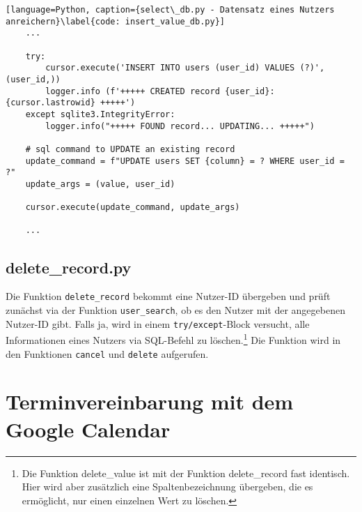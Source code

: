             \begin{lstlisting}[language=Python, caption={select\_db.py - Datensatz eines Nutzers anreichern}\label{code: insert_value_db.py}]
    ...

    try:
        cursor.execute('INSERT INTO users (user_id) VALUES (?)', (user_id,))
        logger.info (f'+++++ CREATED record {user_id}: {cursor.lastrowid} +++++')
    except sqlite3.IntegrityError:
        logger.info("+++++ FOUND record... UPDATING... +++++")

    # sql command to UPDATE an existing record
    update_command = f"UPDATE users SET {column} = ? WHERE user_id = ?"
    update_args = (value, user_id)

    cursor.execute(update_command, update_args)

    ...

            \end{lstlisting}
        
        \subsection{delete\_record.py} \label{Implementierung: delete_record.py}
            Die Funktion \verb|delete_record| bekommt eine Nutzer-ID übergeben und prüft zunächst via der Funktion \verb|user_search|, ob es den Nutzer mit der angegebenen Nutzer-ID gibt. Falls ja, wird in einem \verb|try/except|-Block versucht, alle Informationen eines Nutzers via SQL-Befehl zu löschen.\footnote{Die Funktion delete\_value ist mit der Funktion delete\_record fast identisch. Hier wird aber zusätzlich eine Spaltenbezeichnung übergeben, die es ermöglicht, nur einen einzelnen Wert zu löschen.} Die Funktion wird in den Funktionen \verb|cancel| und \verb|delete| aufgerufen.











    \section{Terminvereinbarung mit dem Google Calendar} \label{Implementierung: Kalender} 
        
